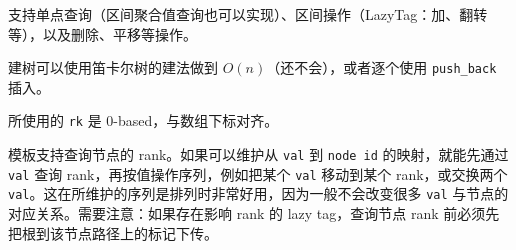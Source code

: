 支持单点查询（区间聚合值查询也可以实现）、区间操作（LazyTag：加、翻转等），以及删除、平移等操作。

建树可以使用笛卡尔树的建法做到 $O(n)$（还不会），或者逐个使用 \texttt{push\_back} 插入。

所使用的 \texttt{rk} 是 0-based，与数组下标对齐。

模板支持查询节点的 rank。如果可以维护从 \texttt{val} 到 \texttt{node id} 的映射，就能先通过 \texttt{val} 查询 rank，再按值操作序列，例如把某个 \texttt{val} 移动到某个 rank，或交换两个 \texttt{val}。这在所维护的序列是排列时非常好用，因为一般不会改变很多 \texttt{val} 与节点的对应关系。需要注意：如果存在影响 rank 的 lazy tag，查询节点 rank 前必须先把根到该节点路径上的标记下传。
